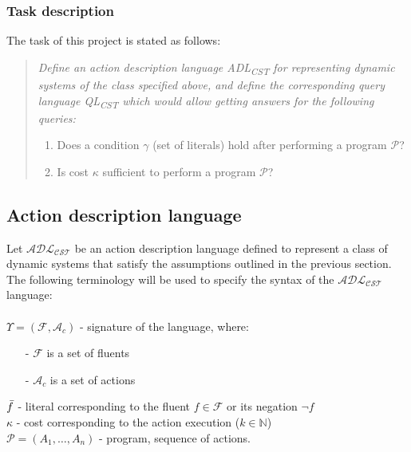 \documentclass[a4paper]{article}
\begin{document}
\subsubsection{Task description}
The task of this project is stated as follows:
\begin{quote}
\itshape
Define an action description language \emph{ADL\textsubscript{CST}} for representing dynamic systems of the class specified above, and define the corresponding query language \emph{QL\textsubscript{CST}} which would allow getting answers for the following queries:
\begin{enumerate}[label=Q{{\arabic*}}.]
    \item Does a condition $\gamma$ (set of literals) hold after performing a program $\mathcal{P}$?
    \item Is cost $\kappa$ sufficient to perform a program $\mathcal{P}$?
\end{enumerate}
\end{quote}
%
\subsection{Action description language}
%
Let $\mathcal{ADL_{CST}}$ be an action description language defined to represent a class of dynamic systems that satisfy the assumptions outlined in the previous section. The following terminology will be used to specify the syntax of the $\mathcal{ADL_{CST}}$ language: \\~\\
$\Upsilon = (\mathcal{F}, \mathcal{A}_c)$ - signature of the language, where:
\begin{itemize}
    \item[-] $\mathcal{F}$ is a set of fluents
    \item[-] $\mathcal{A}_c$ is a set of actions
\end{itemize}
$\Bar{f}$ - literal corresponding to the fluent $f \in \mathcal{F}$ or its negation $\neg f$ \\[0.5\baselineskip]
$\kappa$ - cost corresponding to the action execution ($k \in \mathbb{N}$) \\[0.5\baselineskip]
$\mathcal{P} = (A_1,\dotsc,A_n)$ - program, sequence of actions.
%
\end{document}
